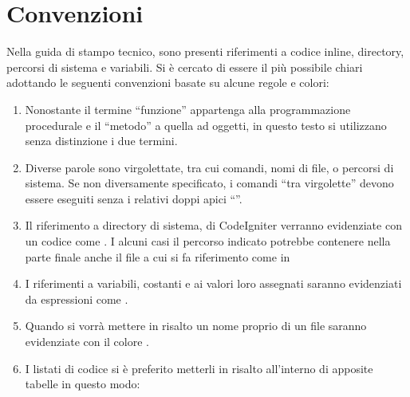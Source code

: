 
{}
\clearpage
\chapter{Convenzioni}
Nella guida di stampo tecnico, sono presenti riferimenti a codice inline, directory, percorsi di sistema e variabili. Si è cercato di essere il più possibile chiari adottando le seguenti convenzioni basate su alcune regole e colori:

\begin{enumerate}
\item Nonostante il termine ``funzione'' appartenga alla programmazione procedurale e il ``metodo'' a quella ad oggetti, in questo testo si utilizzano senza distinzione i due termini.
\item Diverse parole sono virgolettate, tra cui comandi, nomi di file, o percorsi di sistema. Se non diversamente specificato, i comandi ``tra virgolette'' devono essere eseguiti senza i relativi doppi apici ``''.
\item Il riferimento a directory di sistema, di CodeIgniter verranno evidenziate con un codice come . I alcuni casi il percorso indicato potrebbe contenere nella parte finale anche il file a cui si fa riferimento come in 
\item I riferimenti a variabili, costanti e ai valori loro assegnati saranno evidenziati da espressioni come .
\item Quando si vorrà mettere in risalto un nome proprio di un file saranno evidenziate con il colore .
\item I listati di codice si è preferito metterli in risalto all'interno di apposite tabelle in questo modo:

\end{enumerate}
